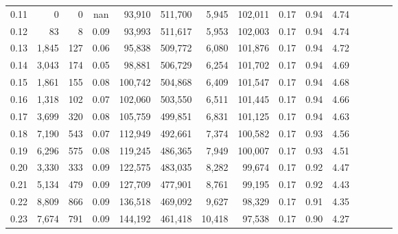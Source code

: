 \begin{tabular}{rrrcrrrrrrrrrrr}
0.11 &       0 &      0 &                                        nan &   93,910 &  511,700 &    5,945 &  102,011 &  0.17 &  0.94 &                         4.74 \\
0.12 &      83 &      8 &                                       0.09 &   93,993 &  511,617 &    5,953 &  102,003 &  0.17 &  0.94 &                         4.74 \\
0.13 &   1,845 &    127 &                                       0.06 &   95,838 &  509,772 &    6,080 &  101,876 &  0.17 &  0.94 &                         4.72 \\
0.14 &   3,043 &    174 &                                       0.05 &   98,881 &  506,729 &    6,254 &  101,702 &  0.17 &  0.94 &                         4.69 \\
0.15 &   1,861 &    155 &                                       0.08 &  100,742 &  504,868 &    6,409 &  101,547 &  0.17 &  0.94 &                         4.68 \\
0.16 &   1,318 &    102 &                                       0.07 &  102,060 &  503,550 &    6,511 &  101,445 &  0.17 &  0.94 &                         4.66 \\
0.17 &   3,699 &    320 &                                       0.08 &  105,759 &  499,851 &    6,831 &  101,125 &  0.17 &  0.94 &                         4.63 \\
0.18 &   7,190 &    543 &                                       0.07 &  112,949 &  492,661 &    7,374 &  100,582 &  0.17 &  0.93 &                         4.56 \\
0.19 &   6,296 &    575 &                                       0.08 &  119,245 &  486,365 &    7,949 &  100,007 &  0.17 &  0.93 &                         4.51 \\
0.20 &   3,330 &    333 &                                       0.09 &  122,575 &  483,035 &    8,282 &   99,674 &  0.17 &  0.92 &                         4.47 \\
0.21 &   5,134 &    479 &                                       0.09 &  127,709 &  477,901 &    8,761 &   99,195 &  0.17 &  0.92 &                         4.43 \\
0.22 &   8,809 &    866 &                                       0.09 &  136,518 &  469,092 &    9,627 &   98,329 &  0.17 &  0.91 &                         4.35 \\
0.23 &   7,674 &    791 &                                       0.09 &  144,192 &  461,418 &   10,418 &   97,538 &  0.17 &  0.90 &                         4.27 \\

\end{tabular}
